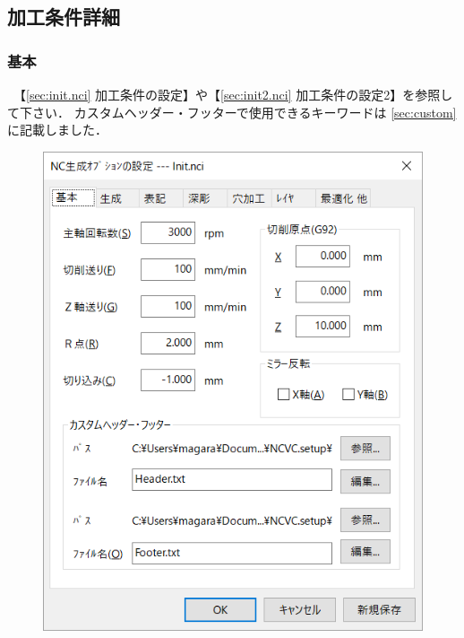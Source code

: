 
\subsection{加工条件詳細}

\subsubsection{基本}
\begin{minipage}[t]{0.5\textwidth}
　【\ref{sec:init.nci} 加工条件の設定】や【\ref{sec:init2.nci} 加工条件の設定2】を参照して下さい．
カスタムヘッダー・フッターで使用できるキーワードは \ref{sec:custom} に記載しました．
\end{minipage}
\begin{minipage}[t]{0.5\textwidth}
\vspace*{-2zh}
\begin{figure}[H]
\centering
\includegraphics[scale=0.7]{No6/fig/init1.png}
\label{fig:init1.png}
\end{figure}
\end{minipage}

